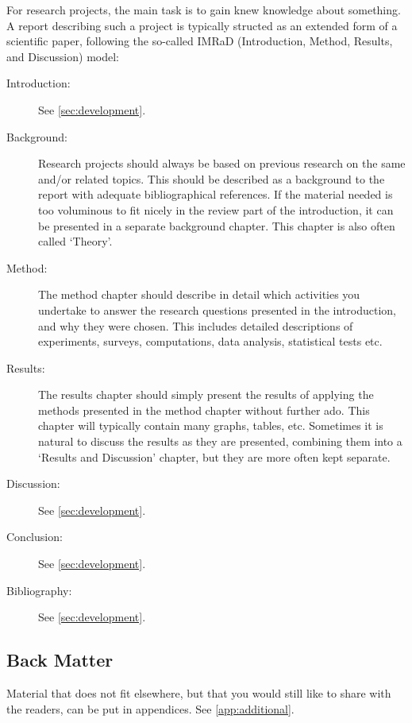 For research projects, the main task is to gain knew knowledge about something. A report describing such a project is typically structed as an extended form of a scientific paper, following the so-called IMRaD (Introduction, Method, Results, and Discussion) model:

\begin{description}
    \item[Introduction:] See \cref{sec:development}.
    \item[Background:] Research projects should always be based on previous research on the same and/or related topics. This should be described as a background to the report with adequate bibliographical references. If the material needed is too voluminous to fit nicely in the review part of the introduction, it can be presented in a separate background chapter. This chapter is also often called `Theory'.
    \item[Method:] The method chapter should describe in detail which activities you undertake to answer the research questions presented in the introduction, and why they were chosen. This includes detailed descriptions of experiments, surveys, computations, data analysis, statistical tests etc.
    \item[Results:] The results chapter should simply present the results of applying the methods presented in the method chapter without further ado. This chapter will typically contain many graphs, tables, etc. Sometimes it is natural to discuss the results as they are presented, combining them into a `Results and Discussion' chapter, but they are more often kept separate.
    \item[Discussion:] See \cref{sec:development}.
    \item[Conclusion:] See \cref{sec:development}.
    \item[Bibliography:] See \cref{sec:development}.
\end{description}

\subsection{Back Matter}

Material that does not fit elsewhere, but that you would still like to share with the readers, can be put in appendices. See \cref{app:additional}.

